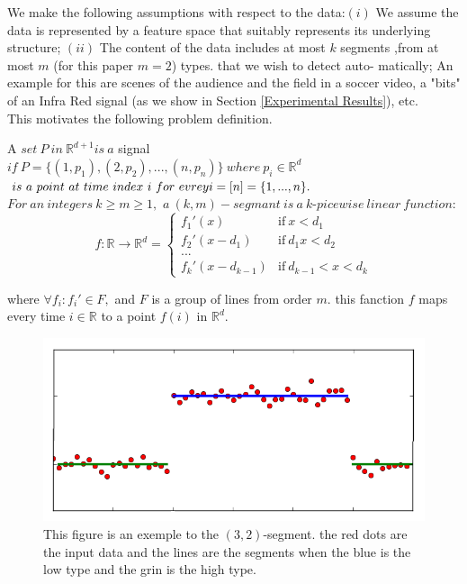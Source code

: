 \documentclass[12pt]{llncs}
\begin{document}
We make the following assumptions with respect to the data:$(i)$ We assume the
data is represented by a feature space that suitably represents its underlying structure;
$(ii)$ The content of the data includes at most $k$ segments ,from at most $m$ (for this paper $m=2$) types. that we wish to detect auto-
matically; An example for this are scenes of the audience and the field in a soccer video, a "bits" of an Infra Red signal (as we show in Section \ref{Experimental Results}), etc. \\
This motivates the following problem definition.


\begin{definition}
A $set\ P\ in\ \mathbb{R}^{d+1} is\ a$ signal\\ 
$if\ P = \lbrace(1, p_1),(2, p_2),...,(n, p_n)\rbrace\ where\ p_i\in\mathbb{R}^d$ 
$is\ a\ point\ at\ time\ index\ i\ for\ evrey\\
i=[n]=\lbrace1,...,n\rbrace.$
$For\ an\ integers\ k\geq m\geq1,$
$a\ (k,m)-segmant\ is\ a\ k$-$picewise\ linear\ function:$
\[
f:\mathbb{R}\rightarrow\mathbb{R}^d = 
\begin{cases}
  \phantom{}f_1'(x) & \text{if}\ x<d_1 \\
  f_2'(x-d_1)        & \text{if}\ d_1x<d_2\\
  ...\\
  f_k'(x-d_{k-1})    & \text{if}\ d_{k-1}<x<d_k
\end{cases}
\]


where $\forall f_i : f_i' \in F,$ and $F$ is a group of lines from order $m$.
this fanction $f$ maps every time $i\in \mathbb{R}$ to a point $f(i)$ in $\mathbb{R}^d$.
\begin{figure}[H]

    \includegraphics[width=\textwidth]{12.png}
      \caption{This figure is an exemple to the $(3,2)$-segment. the red dots are the input data and the lines are the segments when the blue is the low type and the grin is the high type. 
      }
      \noindent\makebox[\linewidth]{\rule{\textwidth}{0.4pt}}
  \centering
\end{figure}


\end{definition}
\end{document}
